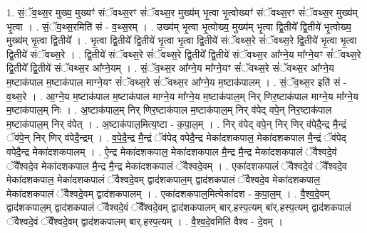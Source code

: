 \documentclass[17pt]{extarticle}
\begin{document}
1. सं॒ॅव॒थ्स॒र मुख्य॒ मुख्यꣳ॑ संॅवथ्स॒रꣳ सं॑ॅवथ्स॒र मुख्य॑म् भृ॒त्वा भृ॒त्वोख्यꣳ॑ संॅवथ्स॒रꣳ सं॑ॅवथ्स॒र मुख्य॑म् भृ॒त्वा । . सं॒ॅव॒थ्स॒रमिति॑ सं - व॒थ्स॒रम् । . उख्य॑म् भृ॒त्वा भृ॒त्वोख्य॒ मुख्य॑म् भृ॒त्वा द्वि॒तीये᳚ द्वि॒तीये॑ भृ॒त्वोख्य॒ मुख्य॑म् भृ॒त्वा द्वि॒तीये᳚ । . भृ॒त्वा द्वि॒तीये᳚ द्वि॒तीये॑ भृ॒त्वा भृ॒त्वा द्वि॒तीये॑ संॅवथ्स॒रे सं॑ॅवथ्स॒रे द्वि॒तीये॑ भृ॒त्वा भृ॒त्वा द्वि॒तीये॑ संॅवथ्स॒रे । . द्वि॒तीये॑ संॅवथ्स॒रे सं॑ॅवथ्स॒रे द्वि॒तीये᳚ द्वि॒तीये॑ संॅवथ्स॒र आ᳚ग्ने॒य मा᳚ग्ने॒यꣳ सं॑ॅवथ्स॒रे द्वि॒तीये᳚ द्वि॒तीये॑ संॅवथ्स॒र आ᳚ग्ने॒यम् । . सं॒ॅव॒थ्स॒र आ᳚ग्ने॒य मा᳚ग्ने॒यꣳ सं॑ॅवथ्स॒रे सं॑ॅवथ्स॒र आ᳚ग्ने॒य म॒ष्टाक॑पाल म॒ष्टाक॑पाल माग्ने॒यꣳ सं॑ॅवथ्स॒रे सं॑ॅवथ्स॒र आ᳚ग्ने॒य म॒ष्टाक॑पालम् । . सं॒ॅव॒थ्स॒र इति॑ सं - व॒थ्स॒रे । . आ॒ग्ने॒य म॒ष्टाक॑पाल म॒ष्टाक॑पाल माग्ने॒य मा᳚ग्ने॒य म॒ष्टाक॑पाल॒म् निर् णिर॒ष्टाक॑पाल माग्ने॒य मा᳚ग्ने॒य म॒ष्टाक॑पाल॒म् निः । . अ॒ष्टाक॑पाल॒म् निर् णिर॒ष्टाक॑पाल म॒ष्टाक॑पाल॒म् निर् व॑पेद् वपे॒न् निर॒ष्टाक॑पाल म॒ष्टाक॑पाल॒म् निर् व॑पेत् । . अ॒ष्टाक॑पाल॒मित्य॒ष्टा - क॒पा॒ल॒म् । . निर् व॑पेद् वपे॒न् निर् णिर् व॑पेदै॒न्द्र मै॒न्द्रं ॅव॑पे॒न् निर् णिर् व॑पेदै॒न्द्रम् । . व॒पे॒दै॒न्द्र मै॒न्द्रं ॅव॑पेद् वपेदै॒न्द्र मेका॑दशकपाल॒ मेका॑दशकपाल मै॒न्द्रं ॅव॑पेद् 
वपेदै॒न्द्र मेका॑दशकपालम् । . ऐ॒न्द्र मेका॑दशकपाल॒ मेका॑दशकपाल मै॒न्द्र मै॒न्द्र मेका॑दशकपालं ॅवैश्वदे॒वं ॅवै᳚श्वदे॒व मेका॑दशकपाल मै॒न्द्र मै॒न्द्र मेका॑दशकपालं ॅवैश्वदे॒वम् । . एका॑दशकपालं ॅवैश्वदे॒वं ॅवै᳚श्वदे॒व मेका॑दशकपाल॒ मेका॑दशकपालं ॅवैश्वदे॒वम् द्वाद॑शकपाल॒म् द्वाद॑शकपालं ॅवैश्वदे॒व मेका॑दशकपाल॒ मेका॑दशकपालं ॅवैश्वदे॒वम् द्वाद॑शकपालम् । . एका॑दशकपाल॒मित्येका॑दश - क॒पा॒ल॒म् । . वै॒श्व॒दे॒वम् द्वाद॑शकपाल॒म् द्वाद॑शकपालं ॅवैश्वदे॒वं ॅवै᳚श्वदे॒वम् द्वाद॑शकपालम् बार्.हस्प॒त्यम् बा॑र्.हस्प॒त्यम् द्वाद॑शकपालं ॅवैश्वदे॒वं ॅवै᳚श्वदे॒वम् द्वाद॑शकपालम् बार्.हस्प॒त्यम् । . वै॒श्व॒दे॒वमिति॑ वैश्व - दे॒वम् । \newline
\end{document}
